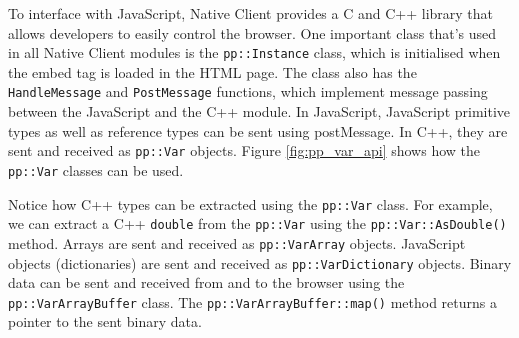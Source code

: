 To interface with JavaScript, Native Client provides a C and C++ library that allows developers to easily control the browser. One important class that's used in all Native Client modules is the \lstinline{pp::Instance} class, which is initialised when the embed tag is loaded in the HTML page. The class also has the \lstinline{HandleMessage} and \lstinline{PostMessage} functions, which implement message passing between the JavaScript and the C++ module. In JavaScript, JavaScript primitive types as well as reference types can be sent using postMessage. In C++, they are sent and received as \lstinline{pp::Var} objects. Figure \ref{fig:pp_var_api} shows how the \lstinline{pp::Var} classes can be used. 

Notice how C++ types can be extracted using the \lstinline{pp::Var} class. For example, we can extract a C++ \lstinline{double} from the \lstinline{pp::Var} using the \lstinline{pp::Var::AsDouble()} method. Arrays are sent and received as \lstinline{pp::VarArray} objects. JavaScript objects (dictionaries) are sent and received as \lstinline{pp::VarDictionary} objects. Binary data can be sent and received from and to the browser using the \lstinline{pp::VarArrayBuffer} class. The \lstinline{pp::VarArrayBuffer::map()} method returns a pointer to the sent binary data. 


